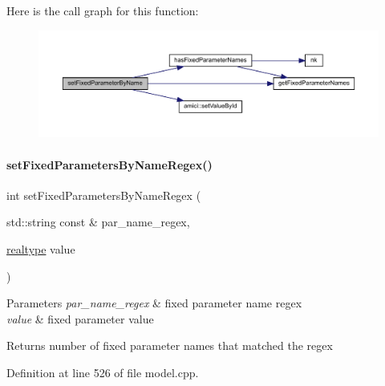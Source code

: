 Here is the call graph for this function\+:
\nopagebreak
\begin{figure}[H]
\begin{center}
\leavevmode
\includegraphics[width=350pt]{classamici_1_1_model_af1225439bd6deceb98b224e75a960800_cgraph}
\end{center}
\end{figure}
\mbox{\label{classamici_1_1_model_a4802f7d56264e3b592c167da8166cb73}} 
\paragraph{\texorpdfstring{set\+Fixed\+Parameters\+By\+Name\+Regex()}{setFixedParametersByNameRegex()}}
{\footnotesize\ttfamily int set\+Fixed\+Parameters\+By\+Name\+Regex (\begin{DoxyParamCaption}\item[{std\+::string const \&}]{par\+\_\+name\+\_\+regex,  }\item[{\mbox{\hyperlink{namespaceamici_a1bdce28051d6a53868f7ccbf5f2c14a3}{realtype}}}]{value }\end{DoxyParamCaption})}


\begin{DoxyParams}{Parameters}
{\em par\+\_\+name\+\_\+regex} & fixed parameter name regex \\
\hline
{\em value} & fixed parameter value \\
\hline
\end{DoxyParams}
\begin{DoxyReturn}{Returns}
number of fixed parameter names that matched the regex 
\end{DoxyReturn}


Definition at line 526 of file model.\+cpp.

